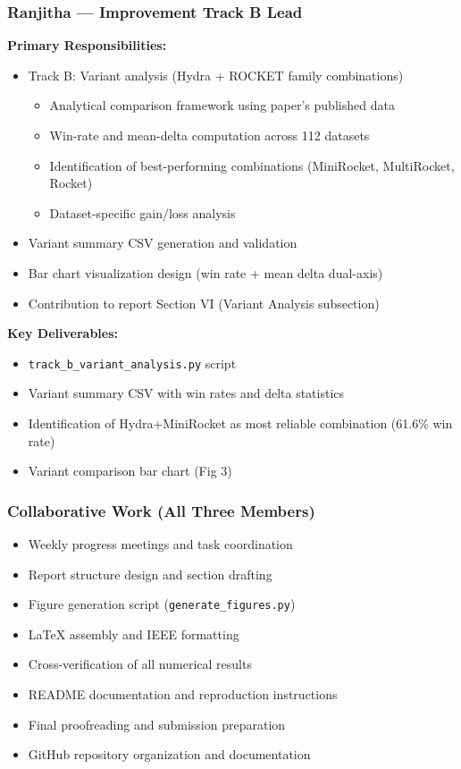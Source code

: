\documentclass[conference]{IEEEtran}
\begin{document}
\subsubsection*{Ranjitha — Improvement Track B Lead}

\textbf{Primary Responsibilities:}
\begin{itemize}
  \item Track B: Variant analysis (Hydra + ROCKET family combinations)
    \begin{itemize}
      \item Analytical comparison framework using paper's published data
      \item Win-rate and mean-delta computation across 112 datasets
      \item Identification of best-performing combinations (MiniRocket, MultiRocket, Rocket)
      \item Dataset-specific gain/loss analysis
    \end{itemize}
  \item Variant summary CSV generation and validation
  \item Bar chart visualization design (win rate + mean delta dual-axis)
  \item Contribution to report Section VI (Variant Analysis subsection)
\end{itemize}

\textbf{Key Deliverables:}
\begin{itemize}
  \item \texttt{track\_b\_variant\_analysis.py} script
  \item Variant summary CSV with win rates and delta statistics
  \item Identification of Hydra+MiniRocket as most reliable combination (61.6\% win rate)
  \item Variant comparison bar chart (Fig 3)
\end{itemize}

\subsubsection*{Collaborative Work (All Three Members)}

\begin{itemize}
  \item Weekly progress meetings and task coordination
  \item Report structure design and section drafting
  \item Figure generation script (\texttt{generate\_figures.py})
  \item LaTeX assembly and IEEE formatting
  \item Cross-verification of all numerical results
  \item README documentation and reproduction instructions
  \item Final proofreading and submission preparation
  \item GitHub repository organization and documentation
\end{itemize}
\end{document}
